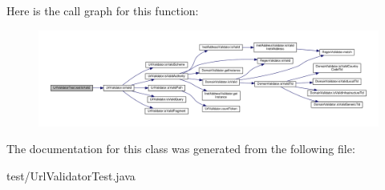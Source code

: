 Here is the call graph for this function\+:
\nopagebreak
\begin{figure}[H]
\begin{center}
\leavevmode
\includegraphics[width=350pt]{classUrlValidatorTest_a81c9df48ab9ffcebda63450df8532b0f_cgraph}
\end{center}
\end{figure}




The documentation for this class was generated from the following file\+:\begin{DoxyCompactItemize}
\item 
test/Url\+Validator\+Test.\+java\end{DoxyCompactItemize}
